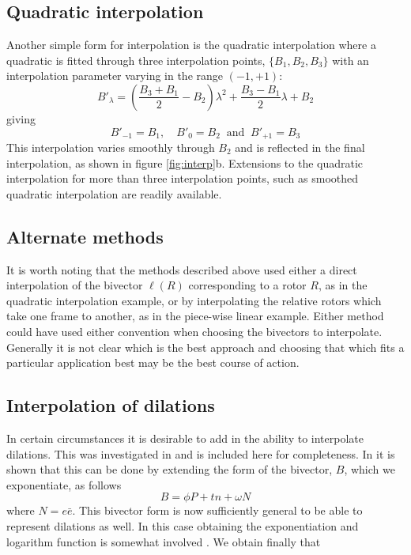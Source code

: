 \subsection{Quadratic interpolation}

Another simple form for interpolation is the quadratic interpolation where a quadratic 
is fitted through three interpolation points, $\{B_1, B_2, B_3\}$ with an interpolation
parameter varying in the range $(-1,+1)$:
\[
B'_\lambda = \left(\frac{B_3 + B_1}{2} - B_2\right)\lambda^2 + \frac{B_3 - B_1}{2}\lambda + B_2
\]
giving
\[
B'_{-1} = B_1,\quad B'_{0}=B_2\ \mbox{ and }\ B'_{+1} = B_3
\]
This interpolation varies smoothly through $B_2$ and is reflected in the final
interpolation, as shown in figure \ref{fig:interp}b. Extensions to the quadratic
interpolation for more than three interpolation points, such as smoothed
quadratic interpolation \cite{cendes} are readily available.

\subsection{Alternate methods}

It is worth noting that the methods described above
used either a direct interpolation of the bivector $\ell(R)$ corresponding
to a rotor $R$, as in the quadratic interpolation example, or by interpolating 
the relative rotors which take one frame
to another, as in the piece-wise linear example. Either method could have used either
convention when choosing the bivectors to interpolate. Generally it is not clear
which is the best approach and choosing that which fits a particular application
best may be the best course of action.

\subsection{Interpolation of dilations}

In certain circumstances it is desirable to add in the ability to interpolate
dilations. This was investigated in \cite{jic23fyr} and is included here
for completeness. In \cite{jic23fyr} it is shown that this can be done by extending
the form of the bivector, $B$, which we exponentiate, as follows
\[
B = \phi P + tn + \omega N
\]
where $N = e\bar{e}$. This bivector form is now sufficiently general
\cite{jic23fyr} to be able to represent dilations as well. In this case obtaining the
exponentiation
and logarithm function is somewhat involved \cite{jic23fyr}. We obtain
finally that

